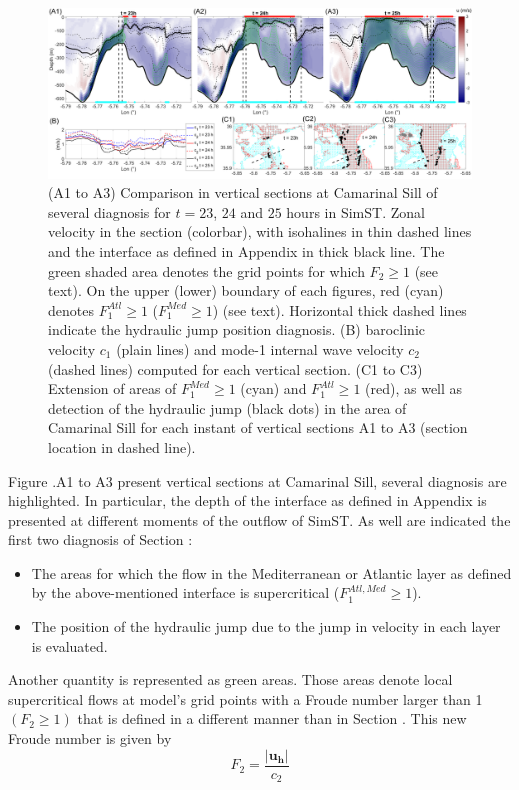 \begin{figure}[!h]
 \centering
 \includegraphics[width=1\textwidth]{./GBR3D/Comp_Diags_corrC1.png}
 \caption [Comparison in vertical sections at Camarinal Sill of several diagnosis]{(A1 to A3) Comparison in vertical sections at Camarinal Sill of several diagnosis for $t=23$, $24$ and $25$ hours in SimST. Zonal velocity in the section (colorbar), with isohalines in thin dashed lines and the interface as defined in Appendix  in thick black line. The green shaded area denotes the grid points for which $F_2 \geq 1$ (see text). On the upper (lower) boundary of each figures, red (cyan) denotes $F_1^{Atl} \geq 1$ ($F_1^{Med} \geq 1$) (see text). Horizontal thick dashed lines indicate the hydraulic jump position diagnosis. (B) baroclinic velocity $c_1$ (plain lines) and mode-1 internal wave velocity $c_2$ (dashed lines) computed for each vertical section. (C1 to C3) Extension of areas of $F_1^{Med} \geq 1$ (cyan) and $F_1^{Atl} \geq 1$ (red), as well as detection of the hydraulic jump (black dots) in the area of Camarinal Sill for each instant of vertical sections A1 to A3 (section location in dashed line). }
 \label{fig_compdiags}
\end{figure}

Figure .A1 to A3 present vertical sections at Camarinal Sill, several diagnosis are highlighted. In particular, the depth of the interface as defined in Appendix  is presented at different moments of the outflow of SimST. As well are indicated the first two diagnosis of Section :
\begin{itemize}
    \item The areas for which the flow in the Mediterranean or Atlantic layer as defined by the above-mentioned interface is supercritical ($F_1^{Atl,Med} \geq 1$).
    \item The position of the hydraulic jump due to the jump in velocity in each layer is evaluated.
\end{itemize}
 Another quantity is represented as green areas. Those areas denote local supercritical flows at model's grid points with a Froude number larger than 1 $(F_2 \geq 1)$ that is defined in a different manner than in Section .%
 This new Froude number is given by 
\begin{equation}
F_2=\frac{\lvert \mathbf{u_h} \rvert}{c_2}
\end{equation}


